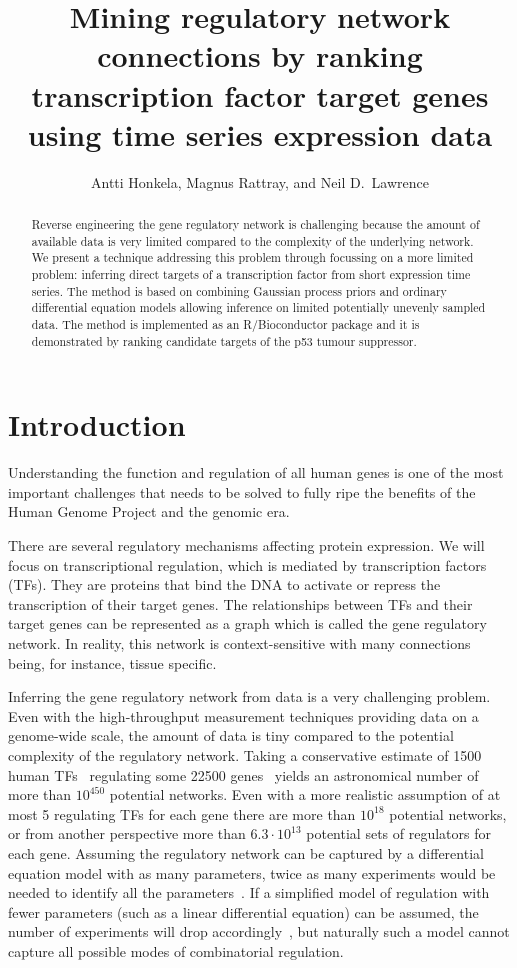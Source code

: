 \documentclass[11pt]{article}
\title{Mining regulatory network connections by ranking transcription
  factor target genes using time series expression data}
\author{Antti Honkela, Magnus Rattray, and Neil D.\ Lawrence}
\begin{document}
\maketitle

\begin{abstract}
Reverse engineering the gene regulatory network is challenging because
the amount of available data is very limited compared to the
complexity of the underlying network.  We present a technique
addressing this problem through focussing on a more limited problem:
inferring direct targets of a transcription factor from short
expression time series.  The method is based on combining Gaussian
process priors and ordinary differential equation models allowing
inference on limited potentially unevenly sampled data.  The method is
implemented as an R/Bioconductor package and it is demonstrated by
ranking candidate targets of the p53 tumour suppressor.
\end{abstract}

\onehalfspacing

\section{Introduction}

Understanding the function and regulation of all human genes is one of
the most important challenges that needs to be solved to fully ripe
the benefits of the Human Genome Project and the genomic era.

There are several regulatory mechanisms affecting protein expression.
We will focus on transcriptional regulation, which is mediated by
transcription factors (TFs).  They are proteins that bind the DNA to
activate or repress the transcription of their target genes.  The
relationships between TFs and their target genes can be represented as
a graph which is called the gene regulatory network.  In reality, this
network is context-sensitive with many connections being, for
instance, tissue specific.

Inferring the gene regulatory network from data is a very challenging
problem.  Even with the high-throughput measurement techniques
providing data on a genome-wide scale, the amount of data is tiny
compared to the potential complexity of the regulatory network.
Taking a conservative estimate of 1500 human TFs~\cite{Vaquerizas2009}
regulating some 22500 genes~\cite{Pertea2010a} yields an astronomical
number of more than $10^{450}$ potential networks.  Even with a more
realistic assumption of at most 5 regulating TFs for each gene there
are more than $10^{18}$ potential networks, or from another
perspective more than $6.3 \cdot 10^{13}$ potential sets of regulators
for each gene.  Assuming the regulatory network can be captured by a
differential equation model with as many parameters, twice as many
experiments would be needed to identify all the
parameters~\cite{Sontag2002}.  If a simplified model of regulation
with fewer parameters (such as a linear differential equation) can be
assumed, the number of experiments will drop
accordingly~\cite{Stark2003}, but naturally such a model cannot
capture all possible modes of combinatorial regulation.
\end{document}
